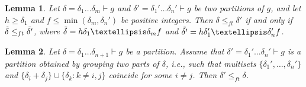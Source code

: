 \documentclass[10pt,a4paper]{amsart}
\newtheorem{lem}{Lemma}
\begin{document}
\begin{lem}
Let $\delta = \delta_{1}\ldots\delta_m \vdash g$ and $\delta' = \delta_{1}'\ldots\delta_n' \vdash g$ be two partitions of $g$, and let $h \geq \delta_1$ and $f \leq \min(\delta_m, \delta_n')$ be positive integers. 
Then ${\delta} \leq_{ft} {\delta}'$ if and only if ${\Tilde{\delta}} \leq_{ft} {\Tilde{\delta'}}$, where $\Tilde{\delta} = h\delta_{1}\ldots\delta_m f$ and $\Tilde{\delta'} = h\delta_{1}'\ldots\delta_n'f$. 
\label{lemma:extension_delta}
\end{lem} 

\begin{lem}
Let $\delta = \delta_1\ldots\delta_{n + 1} \vdash g$ be a partition. Assume that $\delta' = \delta_1'\ldots\delta_n' \vdash g$ is a partition obtained by grouping two parts of $\delta$, i.e., such that multisets $\{\delta_1', \ldots, \delta_n'\}$ and $\{\delta_i + \delta_j\} \cup \{\delta_k: k \neq i, j\}$ coincide for some $i \neq j$. Then ${\delta'}\leq_{ft} {\delta}$.
\label{lem:grouping}
\end{lem}
\end{document}
